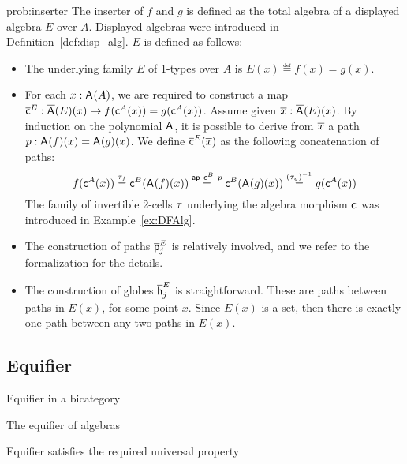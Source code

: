 \begin{construction}{prob:inserter}\label{cons:inserter}
The inserter of $f$ and $g$ is defined as the total algebra of a
displayed algebra $E$ over $A$. Displayed algebras were
introduced in Definition~\ref{def:disp_alg}. $E$ is defined as follows:
\begin{itemize}
\item The underlying family $E$ of 1-types over $A$ is $E(x) \eqdef f(x) = g(x)$.
\item
For each $x : \mathsf{A}^{}(A)$, we are required to construct
a map $\overline{\mathsf{c}}^{E} : \overline{\mathsf{A}^{}}(E)(x) \rightarrow
f(\mathsf{c}^{A}(x)) = g (\mathsf{c}^{A}(x))$. Assume given $\overline{x}
: \overline{\mathsf{A}^{}}(E)(x)$. By induction on the polynomial
$\mathsf{A}^{}$, it is possible to derive from $\overline{x}$ a path $p
: \mathsf{A}^{}(f)(x) = \mathsf{A}^{}(g)(x)$.  We
define $\overline{\mathsf{c}}^{E}(\overline{x})$ as the following concatenation of paths:
\[
f(\mathsf{c}^{A}(x))
\stackrel{\tau_f}{=} \mathsf{c}^{B}(\mathsf{A}^{}(f)(x))
\stackrel{\mathsf{ap} \ \mathsf{c}^{B} \ p}{=} \mathsf{c}^{B}(\mathsf{A}^{}(g)(x))
\stackrel{(\tau_g)^{-1}}{=} g (\mathsf{c}^{A}(x))
\]
The family of invertible 2-cells $\tau$ underlying the algebra
morphism $\mathsf{c}^{}$ was introduced in Example~\ref{ex:DFAlg}.
\item The construction of paths $\overline{\mathsf{p}}^{E}_{j}$ is relatively involved, and we refer to the formalization for the details.
\item
The construction of globes $\overline{\mathsf{h}}^{E}_{j}$ is
straightforward. These are paths between paths in $E(x)$, for some
point $x$. Since $E(x)$ is a set, then there is exactly one path
between any two paths in $E(x)$.
\end{itemize}
\end{construction}

\subsection{Equifier}

\begin{definition}
Equifier in a bicategory
\end{definition}

\begin{definition}
The equifier of algebras
\end{definition}

\begin{proposition}
Equifier satisfies the required universal property
\end{proposition}

